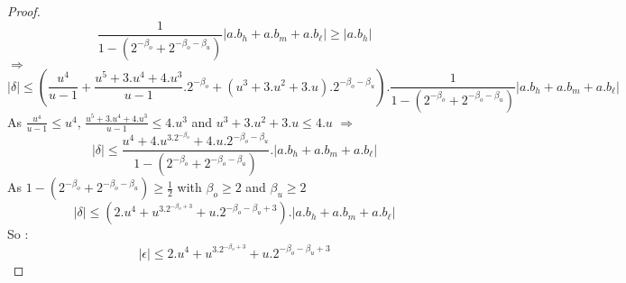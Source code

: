 \begin{proof}
$$ \frac{1}{1-(2^{-\beta_o} +  2^{-\beta_o -\beta_u})}\lvert a.b_h +a.b_m + a.b_{\ell} \rvert \ge \lvert a.b_h \rvert$$
$\Rightarrow$
$$\lvert \delta \rvert \le (\frac{u^4}{u-1} + \frac{u^5+3.u^4+4.u^3}{u-1}.2^{-\beta_o} + (u^3+3.u^2+3.u).2^{-\beta_o - \beta_u}).\frac{1}{1-(2^{-\beta_o} +  2^{-\beta_o -\beta_u})}\lvert a.b_h +a.b_m + a.b_{\ell} \rvert $$
As $\frac{u^4}{u-1} \le u^4$, $\frac{u^5+3.u^4+4.u^3}{u-1} \le 4.u^3$
and $u^3+3.u^2+3.u \le 4.u$ $\Rightarrow$
$$\lvert \delta \rvert \le \frac{u^4 + 4.u^3.2^{-\beta_o} + 4.u.2^{-\beta_o - \beta_u}}{1-(2^{-\beta_o} +  2^{-\beta_o -\beta_u})}.\lvert a.b_h +a.b_m + a.b_{\ell} \rvert $$
As $1-(2^{-\beta_o} +  2^{-\beta_o -\beta_u}) \ge \frac{1}{2}$ with $\beta_o \ge 2$ and $\beta_u \ge 2$
$$\lvert \delta \rvert \le (2.u^4 + u^3.2^{-\beta_o+3} + u.2^{-\beta_o - \beta_u +3}).\lvert a.b_h +a.b_m + a.b_{\ell} \rvert $$
So :
$$\lvert \epsilon \rvert \le 2.u^4 + u^3.2^{-\beta_o+3} + u.2^{-\beta_o - \beta_u +3}$$
\end{proof}